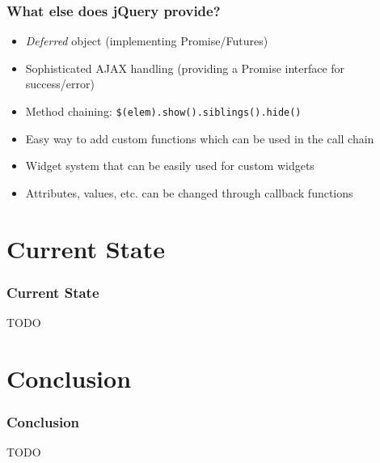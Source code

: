 \documentclass{beamer}
\begin{document}
\begin{frame}
  \frametitle{What else does jQuery provide?}
  \begin{itemize}
    \item \emph{Deferred} object (implementing Promise/Futures)
    \item Sophisticated AJAX handling (providing a Promise interface for success/error)
    \item Method chaining: \lstinline{$(elem).show().siblings().hide()}
    \item Easy way to add custom functions which can be used in the call chain
    \item Widget system that can be easily used for custom widgets
    \item Attributes, values, etc. can be changed through callback functions
  \end{itemize}

  \begin{center}
  \end{center}
\end{frame}

\section{Current State}
\begin{frame}
  \frametitle{Current State}
  TODO
\end{frame}

\section{Conclusion}
\begin{frame}
  \frametitle{Conclusion}
  TODO
\end{frame}
\end{document}
